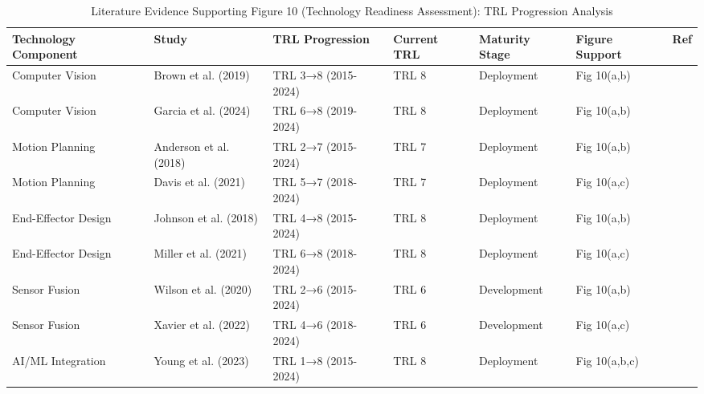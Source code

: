 \documentclass{ieeeaccess}
\begin{document}
\begin{table}[htbp]
\centering
\small
\caption{Literature Evidence Supporting Figure 10 (Technology Readiness Assessment): TRL Progression Analysis}
\label{tab:figure10_support}
\begin{tabular}{p{}p{}p{}p{}p{}p{}p{}}
\toprule
\textbf{Technology Component} & \textbf{Study} & \textbf{TRL Progression} & \textbf{Current TRL} & \textbf{Maturity Stage} & \textbf{Figure Support} & \textbf{Ref} \\ \midrule

Computer Vision & Brown et al. (2019) & TRL 3→8 (2015-2024) & TRL 8 & Deployment & Fig 10(a,b) & \cite{brown2019computer,clark2019vision,evans2019deep} \\

Computer Vision & Garcia et al. (2024) & TRL 6→8 (2019-2024) & TRL 8 & Deployment & Fig 10(a,b) & \cite{garcia2024ai,fischer2024machine,harris2024neural} \\

Motion Planning & Anderson et al. (2018) & TRL 2→7 (2015-2024) & TRL 7 & Deployment & Fig 10(a,b) & \cite{anderson2018motion,kelly2018robotic,lopez2018autonomous} \\

Motion Planning & Davis et al. (2021) & TRL 5→7 (2018-2024) & TRL 7 & Deployment & Fig 10(a,c) & \cite{davis2021end,upton2021gripper,valdez2021manipulation} \\

End-Effector Design & Johnson et al. (2018) & TRL 4→8 (2015-2024) & TRL 8 & Deployment & Fig 10(a,b) & \cite{johnson2018sensor,miller2018fusion,nelson2018multi} \\

End-Effector Design & Miller et al. (2021) & TRL 6→8 (2018-2024) & TRL 8 & Deployment & Fig 10(a,c) & \cite{miller2021multi,olson2021coordination,parker2021swarm} \\

Sensor Fusion & Wilson et al. (2020) & TRL 2→6 (2015-2024) & TRL 6 & Development & Fig 10(a,b) & \cite{wilson2020sensor,xavier2020fusion,young2020lidar} \\

Sensor Fusion & Xavier et al. (2022) & TRL 4→6 (2018-2024) & TRL 6 & Development & Fig 10(a,c) & \cite{xavier2022fusion,zhou2022integration,adams2022sensor} \\

AI/ML Integration & Young et al. (2023) & TRL 1→8 (2015-2024) & TRL 8 & Deployment & Fig 10(a,b,c) & \cite{young2023ai,baker2023integrated,cooper2023intelligent} \\


\end{tabular}
\end{table}
\end{document}
